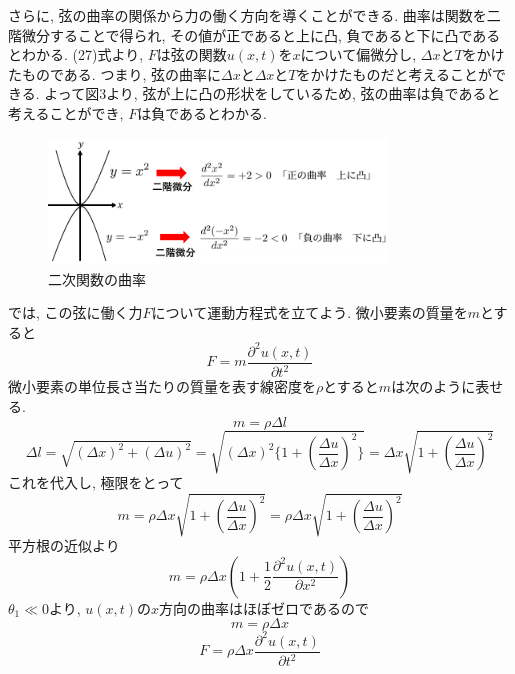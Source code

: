 \documentclass{ltjsarticle}
\begin{document}
さらに, 弦の曲率の関係から力の働く方向を導くことができる. 
曲率は関数を二階微分することで得られ, その値が正であると上に凸, 負であると下に凸であるとわかる. 
(27)式より, $F$は弦の関数$u(x, t)$を$x$について偏微分し, $\Delta x$と$T$をかけたものである. 
つまり, 弦の曲率に$\Delta x$と$\Delta x$と$T$をかけたものだと考えることができる. 
よって図3より, 弦が上に凸の形状をしているため, 弦の曲率は負であると考えることができ, $F$は負であるとわかる. 
\begin{figure}[htbp]
  \centering
  \includegraphics[width=0.8\textwidth]{img/曲率.png}
  \caption{二次関数の曲率}
\end{figure}
では, この弦に働く力$F$について運動方程式を立てよう. 
微小要素の質量を$m$とすると
\begin{equation}
  F = m \frac{\partial^2 u(x ,t)}{\partial t^2}
\end{equation}
微小要素の単位長さ当たりの質量を表す線密度を$\rho$とすると$m$は次のように表せる. 
\begin{equation}
  m = \rho \Delta l
\end{equation}
\begin{equation}
  \Delta l = \sqrt{(\Delta x)^2 + (\Delta u)^2} = 
  \sqrt{(\Delta x)^2 \{ 1 + \left(\frac{\Delta u}{\Delta x}\right)^2 \} } = \Delta x \sqrt{1 + \left(\frac{\Delta u}{\Delta x}\right)^2}
\end{equation}
これを代入し, 極限をとって
\begin{equation}
  m = \rho \Delta x \sqrt{1 + \left(\frac{\Delta u}{\Delta x}\right)^2} =
  \rho \Delta x \sqrt{1 + \left( \frac{\Delta u}{\Delta x} \right)^2}
\end{equation}
平方根の近似より
\begin{equation}
  m = \rho \Delta x \left( 1 + \frac{1}{2} \frac{\partial^2 u(x ,t)}{\partial x^2} \right)
\end{equation}
$\theta_1 \ll 0$より, $u(x,t)$の$x$方向の曲率はほぼゼロであるので
\begin{equation}
  m = \rho \Delta x 
\end{equation}
\begin{equation}
  F = \rho \Delta x \frac{\partial^2 u(x ,t)}{\partial t^2}
\end{equation}
\end{document}
